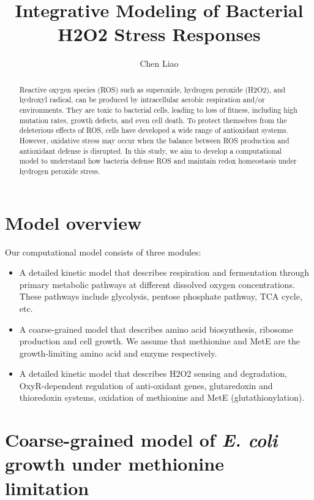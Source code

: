 \documentclass[10pt]{article}
\begin{document}
\title{Integrative Modeling of Bacterial H2O2 Stress Responses}
\author{Chen Liao}

\maketitle
\tableofcontents

\clearpage
\begin{abstract}
Reactive oxygen species (ROS) such as superoxide, hydrogen peroxide (H2O2), and hydroxyl radical, can be produced by intracellular aerobic respiration and/or environments. They are toxic to bacterial cells, leading to loss of fitness, including high mutation rates, growth defects, and even cell death. To protect themselves from the deleterious effects of ROS, cells have developed a wide range of antioxidant systems. However, oxidative stress may occur when the balance between ROS production and antioxidant defense is disrupted. In this study, we aim to develop a computational model to understand how bacteria defense ROS and maintain redox homeostasis under hydrogen peroxide stress.
\end{abstract}

\clearpage
\section{Model overview}

Our computational model consists of three modules:
\begin{itemize}
\item{A detailed kinetic model that describes respiration and fermentation through primary metabolic pathways at different dissolved oxygen concentrations. These pathways include glycolysis, pentose phosphate pathway, TCA cycle, etc.}
\item{A coarse-grained model that describes amino acid biosynthesis, ribosome production and cell growth. We assume that methionine and MetE are the growth-limiting amino acid and enzyme respectively.}
\item{A detailed kinetic model that describes H2O2 sensing and degradation, OxyR-dependent regulation of anti-oxidant genes, glutaredoxin and thioredoxin systems, oxidation of methionine and MetE (glutathionylation).  }
\end{itemize}

\clearpage
\section{Coarse-grained model of \textit{E. coli} growth under methionine limitation}
\end{document}
